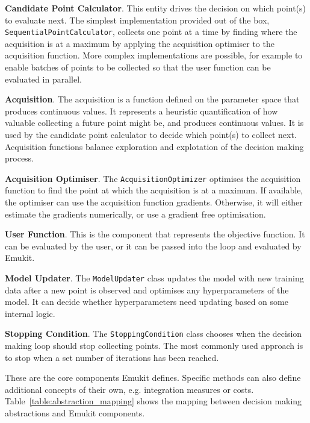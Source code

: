 \textbf{Candidate Point Calculator}. This entity drives the decision on which point(s) to evaluate next. The simplest implementation provided out of the box, \texttt{SequentialPointCalculator}, collects one point at a time by finding where the acquisition is at a maximum by applying the acquisition optimiser to the acquisition function. More complex implementations are possible, for example to enable batches of points to be collected so that the user function can be evaluated in parallel.

\textbf{Acquisition}. The acquisition is a function defined on the parameter space that produces continuous values. It represents a heuristic quantification of how valuable collecting a future point might be, and produces continuous values. It is used by the candidate point calculator to decide which point(s) to collect next. Acquisition functions balance exploration and explotation of the decision making process.

\textbf{Acquisition Optimiser}. The \texttt{AcquisitionOptimizer} optimises the acquisition function to find the point at which the acquisition is at a maximum. If available, the optimiser can use the acquisition function gradients. Otherwise, it will either estimate the gradients numerically, or use a gradient free optimisation.

\textbf{User Function}. This is the component that represents the objective function. It can be evaluated by the user, or it can be passed into the loop and evaluated by Emukit.

\textbf{Model Updater}. The \texttt{ModelUpdater} class updates the model with new training data after a new point is observed and optimises any hyperparameters of the model. It can decide whether hyperparameters need updating based on some internal logic.

\textbf{Stopping Condition}. The \texttt{StoppingCondition} class chooses when the decision making loop should stop collecting points. The most commonly used approach is to stop when a set number of iterations has been reached.

These are the core components Emukit defines. Specific methods can also define additional concepts of their own, e.g. integration measures or costs. Table~\ref{table:abstraction_mapping} shows the mapping between decision making abstractions and Emukit components.

